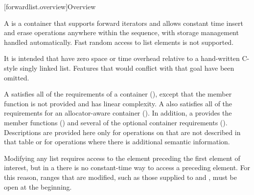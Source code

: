[forwardlist.overview]{Overview}

\pnum
A  is a container that supports forward iterators and allows
constant time insert and erase operations anywhere within the sequence, with storage
management handled automatically. Fast random access to list elements is not supported.
\begin{note} It is intended that  have zero space or time overhead
relative to a hand-written C-style singly linked list. Features that would conflict with
that goal have been omitted.\end{note}

\pnum
A  satisfies all of the requirements of a container
(), except that the 
member function is not provided and  has linear complexity.
A  also satisfies all of the requirements for an allocator-aware
container (). In addition, a 
provides the  member functions
() and several of the optional
container requirements ().
Descriptions are provided here only for operations on
 that are not described in that table or for operations where there
is additional semantic information.

\pnum
\begin{note} Modifying any list requires access to the element preceding the first element
of interest, but in a  there is no constant-time way to access a
preceding element. For this reason, ranges that are modified, such as those supplied to
 and , must be open at the beginning. \end{note}


